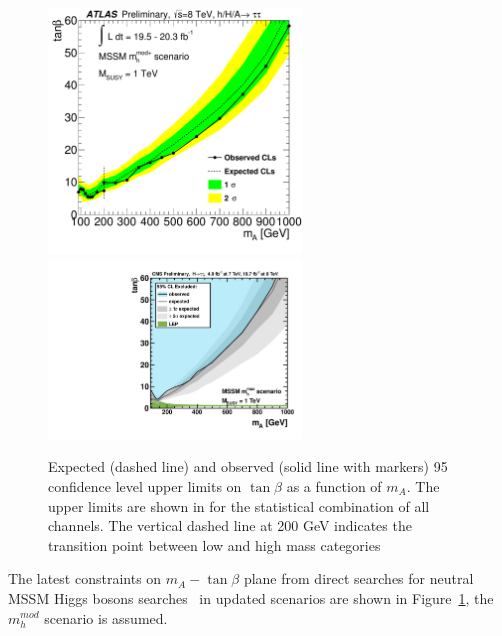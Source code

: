 \begin{figure}[p]
     \begin{center}
            \includegraphics[width=0.6\textwidth]{figure/paper/limit_comb_2d_mhmodp.pdf}
            \includegraphics[width=0.6\textwidth]{figure/limits/CSM.pdf}
    \end{center}

  \caption{ Expected (dashed line) and observed (solid line with markers) 95 confidence level upper limits on $\tan\beta$ as a function of $m_A$. 
	The upper limits are shown in for the statistical combination of all channels. The vertical dashed line at 200 GeV indicates 
	the transition point between low and high mass categories~\cite{yuppy}}

  \label{fig:ex2}
\end{figure}



The latest constraints on $m_A - \tan\beta$  plane from direct searches for neutral MSSM Higgs bosons searches~\cite{yuppy} in updated scenarios 
are  shown in Figure~\ref{fig:ex2}, the $m_h^{mod}$ scenario is assumed. 



 




















